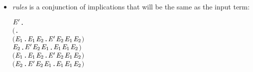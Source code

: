 \begin{itemize}
\item \emph{rules} is a conjunction of implications that will be the
    same as the input term:
\begin{alltt}
\HOLTokenTurnstile{} \HOLSymConst{\HOLTokenForall{}} \ensuremath{\HOLBoundVar{E}\sp{\prime}}.
       \ensuremath{(}\HOLSymConst{\HOLTokenForall{}}.
            \ensuremath{(}\HOLSymConst{\HOLTokenForall{}}\ensuremath{\HOLBoundVar{E}\sb{\mathrm{1}}}.  \HOLTokenTransBegin{} \HOLTokenTransEnd \ensuremath{\HOLBoundVar{E}\sb{\mathrm{1}}} \HOLSymConst{\HOLTokenImp{}} \HOLSymConst{\HOLTokenExists{}}\ensuremath{\HOLBoundVar{E}\sb{\mathrm{2}}}. \ensuremath{\HOLBoundVar{E}\sp{\prime}} \HOLTokenWeakTransBegin{} \HOLTokenWeakTransEnd \ensuremath{\HOLBoundVar{E}\sb{\mathrm{2}}} \HOLSymConst{\HOLTokenConj{}} \ensuremath{\HOLBoundVar{E}\sb{\mathrm{1}}} \HOLSymConst{\HOLTokenWeakEQ} \ensuremath{\HOLBoundVar{E}\sb{\mathrm{2}}}\ensuremath{)} \HOLSymConst{\HOLTokenConj{}}
            \HOLSymConst{\HOLTokenForall{}}\ensuremath{\HOLBoundVar{E}\sb{\mathrm{2}}}. \ensuremath{\HOLBoundVar{E}\sp{\prime}} \HOLTokenTransBegin{} \HOLTokenTransEnd \ensuremath{\HOLBoundVar{E}\sb{\mathrm{2}}} \HOLSymConst{\HOLTokenImp{}} \HOLSymConst{\HOLTokenExists{}}\ensuremath{\HOLBoundVar{E}\sb{\mathrm{1}}}.  \HOLTokenWeakTransBegin{} \HOLTokenWeakTransEnd \ensuremath{\HOLBoundVar{E}\sb{\mathrm{1}}} \HOLSymConst{\HOLTokenConj{}} \ensuremath{\HOLBoundVar{E}\sb{\mathrm{1}}} \HOLSymConst{\HOLTokenWeakEQ} \ensuremath{\HOLBoundVar{E}\sb{\mathrm{2}}}\ensuremath{)} \HOLSymConst{\HOLTokenConj{}}
       \ensuremath{(}\HOLSymConst{\HOLTokenForall{}}\ensuremath{\HOLBoundVar{E}\sb{\mathrm{1}}}.  \HOLTokenTransBegin\HOLSymConst{\ensuremath{\tau}}\HOLTokenTransEnd \ensuremath{\HOLBoundVar{E}\sb{\mathrm{1}}} \HOLSymConst{\HOLTokenImp{}} \HOLSymConst{\HOLTokenExists{}}\ensuremath{\HOLBoundVar{E}\sb{\mathrm{2}}}. \ensuremath{\HOLBoundVar{E}\sp{\prime}} \HOLSymConst{\HOLTokenEPS} \ensuremath{\HOLBoundVar{E}\sb{\mathrm{2}}} \HOLSymConst{\HOLTokenConj{}} \ensuremath{\HOLBoundVar{E}\sb{\mathrm{1}}} \HOLSymConst{\HOLTokenWeakEQ} \ensuremath{\HOLBoundVar{E}\sb{\mathrm{2}}}\ensuremath{)} \HOLSymConst{\HOLTokenConj{}}
       \ensuremath{(}\HOLSymConst{\HOLTokenForall{}}\ensuremath{\HOLBoundVar{E}\sb{\mathrm{2}}}. \ensuremath{\HOLBoundVar{E}\sp{\prime}} \HOLTokenTransBegin\HOLSymConst{\ensuremath{\tau}}\HOLTokenTransEnd \ensuremath{\HOLBoundVar{E}\sb{\mathrm{2}}} \HOLSymConst{\HOLTokenImp{}} \HOLSymConst{\HOLTokenExists{}}\ensuremath{\HOLBoundVar{E}\sb{\mathrm{1}}}.  \HOLSymConst{\HOLTokenEPS} \ensuremath{\HOLBoundVar{E}\sb{\mathrm{1}}} \HOLSymConst{\HOLTokenConj{}} \ensuremath{\HOLBoundVar{E}\sb{\mathrm{1}}} \HOLSymConst{\HOLTokenWeakEQ} \ensuremath{\HOLBoundVar{E}\sb{\mathrm{2}}}\ensuremath{)} \HOLSymConst{\HOLTokenImp{}}

\end{alltt}
\end{itemize}
